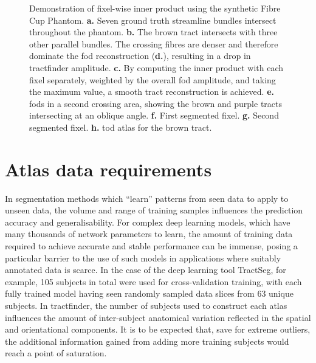 \documentclass[12pt,phd,a4paper,twoside]{ucl_thesis}
\begin{document}
\begin{figure}[tbh!]
  \centering
  
  \caption[Fixel inner product]{Demonstration of fixel-wise inner product using the synthetic Fibre Cup Phantom.
  \textbf{\sffamily a.} Seven ground truth streamline bundles intersect throughout the phantom.
  \textbf{\sffamily b.} The brown tract intersects with three other parallel bundles. The crossing fibres are denser and therefore dominate the \gls{fod} reconstruction (\textbf{\sffamily d.}), resulting in a drop in tractfinder amplitude.
  \textbf{\sffamily c.} By computing the inner product with each fixel separately, weighted by the overall \gls{fod} amplitude, and taking the maximum value, a smooth tract reconstruction is achieved.
  \textbf{\sffamily e.} \glspl{fod} in a second crossing area, showing the brown and purple tracts intersecting at an oblique angle.
  \textbf{\sffamily f.} First segmented fixel.
  \textbf{\sffamily g.} Second segmented fixel.
  \textbf{\sffamily h.} \Gls{tod} atlas for the brown tract.}\label{fig:fixip}
\end{figure}
\clearpage{}
\clearpage{}\section{Atlas data requirements}\label{sec:ntrain}

In segmentation methods which ``learn'' patterns from seen data to apply to unseen data, the volume and range of training samples influences the prediction accuracy and generalisability.
For complex deep learning models, which have many thousands of network parameters to learn, the amount of training data required to achieve accurate and stable performance can be immense, posing a particular barrier to the use of such models in applications where suitably annotated data is scarce.
In the case of the deep learning tool TractSeg\autocite{Wasserthal2018}, for example, 105 subjects in total were used for cross-validation training, with each fully trained model having seen randomly sampled data slices from 63 unique subjects.
In tractfinder, the number of subjects used to construct each atlas influences the amount of inter-subject anatomical variation reflected in the spatial and orientational components.
It is to be expected that, save for extreme outliers, the additional information gained from adding more training subjects would reach a point of saturation.
\end{document}
